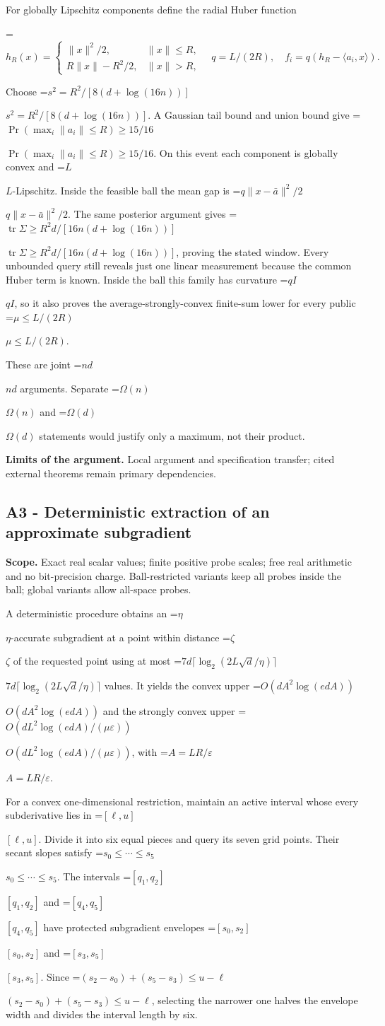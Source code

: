 \documentclass[10pt,a4paper]{article}
\newcommand{\AtlasMath}[1]{\par\begingroup\centering\setbox0=\hbox{$\displaystyle #1$}\ifdim\wd0>1.4\linewidth\typeout{ATLAS WIDE FORMULA: \the\wd0}\fi\ifdim\wd0>\linewidth\resizebox{\linewidth}{!}{\box0}\else\box0\fi\par\endgroup}
\newcommand{\AtlasInlineMath}[1]{\begingroup\setbox0=\hbox{$#1$}\ifdim\wd0>.4\linewidth\endgroup\AtlasMath{#1}\else\endgroup$#1$\fi}
\begin{document}
For globally Lipschitz components define the radial Huber function

\AtlasMath{h_R(x)=\begin{cases}\|x\|^2/2,&\|x\|\le R,\\R\|x\|-R^2/2,&\|x\|>R,\end{cases}\quad q=L/(2R),\quad f_i=q(h_R-\langle a_i,x\rangle).}

Choose \AtlasInlineMath{s^2=R^2/[8(d+\log(16n))]}. A Gaussian tail bound and union bound give \AtlasInlineMath{\Pr(\max_i\|a_i\|\le R)\ge15/16}. On this event each component is globally convex and \AtlasInlineMath{L}-Lipschitz. Inside the feasible ball the mean gap is \AtlasInlineMath{q\|x-\bar a\|^2/2}. The same posterior argument gives \AtlasInlineMath{\operatorname{tr}\Sigma\ge R^2d/[16n(d+\log(16n))]}, proving the stated window. Every unbounded query still reveals just one linear measurement because the common Huber term is known. Inside the ball this family has curvature \AtlasInlineMath{qI}, so it also proves the average-strongly-convex finite-sum lower for every public \AtlasInlineMath{\mu\le L/(2R)}.

These are joint \AtlasInlineMath{nd} arguments. Separate \AtlasInlineMath{\Omega(n)} and \AtlasInlineMath{\Omega(d)} statements would justify only a maximum, not their product.

\textbf{Limits of the argument.} Local argument and specification transfer; cited external theorems remain primary dependencies.

\subsection{A3 - Deterministic extraction of an approximate subgradient}
\textbf{Scope.} Exact real scalar values; finite positive probe scales; free real arithmetic and no bit-precision charge. Ball-restricted variants keep all probes inside the ball; global variants allow all-space probes.

A deterministic procedure obtains an \AtlasInlineMath{\eta}-accurate subgradient at a point within distance \AtlasInlineMath{\zeta} of the requested point using at most \AtlasInlineMath{7d\lceil\log_2(2L\sqrt d/\eta)\rceil} values. It yields the convex upper \AtlasInlineMath{O(dA^2\log(edA))} and the strongly convex upper \AtlasInlineMath{O(dL^2\log(edA)/(\mu\varepsilon))}, with \AtlasInlineMath{A=LR/\varepsilon}.

For a convex one-dimensional restriction, maintain an active interval whose every subderivative lies in \AtlasInlineMath{[\ell,u]}. Divide it into six equal pieces and query its seven grid points. Their secant slopes satisfy \AtlasInlineMath{s_0\le\cdots\le s_5}. The intervals \AtlasInlineMath{[q_1,q_2]} and \AtlasInlineMath{[q_4,q_5]} have protected subgradient envelopes \AtlasInlineMath{[s_0,s_2]} and \AtlasInlineMath{[s_3,s_5]}. Since \AtlasInlineMath{(s_2-s_0)+(s_5-s_3)\le u-\ell}, selecting the narrower one halves the envelope width and divides the interval length by six.
\end{document}

